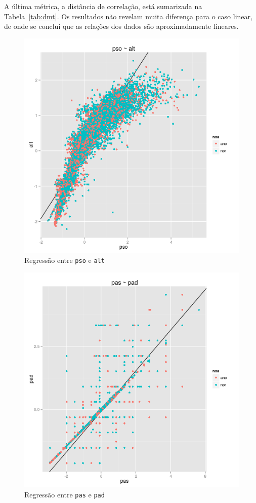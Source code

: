 \documentclass[10pt, conference, compsocconf]{IEEEtran}
\begin{document}
A última métrica, a distância de correlação, está sumarizada na
Tabela~\ref{tab:dmt}. Os resultados não revelam muita diferença para o
caso linear, de onde se conclui que as relações dos dados são
aproximadamente lineares.

\begin{figure}[H]
  \centering
  \includegraphics[scale=0.4]{img/reg_pso_alt.png}
  \caption{Regressão entre {\tt pso} e {\tt alt}}
  \label{fig:reg1}
\end{figure}

\begin{figure}[H]
  \centering
  \includegraphics[scale=0.4]{img/reg_pas_pad.png}
  \caption{Regressão entre {\tt pas} e {\tt pad}}
  \label{fig:reg2}
\end{figure}
\end{document}
